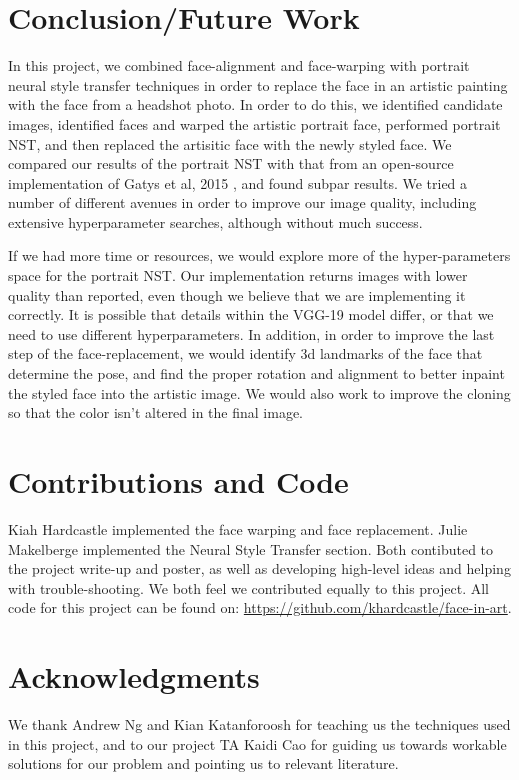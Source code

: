 \documentclass{article}
\begin{document}
\section{Conclusion/Future Work}

In this project, we combined face-alignment and face-warping with portrait neural style transfer techniques in order to replace the face in an artistic painting with the face from a headshot photo. In order to do this, we identified candidate images, identified faces and warped the artistic portrait face, performed portrait NST, and then replaced the artisitic face with the newly styled face. We compared our results of the portrait NST with that from an open-source implementation of Gatys et al, 2015 \cite{NeuralStyleTranferGithub}, and found subpar results. We tried a number of different avenues in order to improve our image quality, including extensive hyperparameter searches, although without much success.  

If we had more time or resources, we would explore more of the hyper-parameters space for the portrait NST. Our implementation returns images with lower quality than reported, even though we believe that we are implementing it correctly. It is possible that details within the VGG-19 model differ, or that we need to use different hyperparameters. In addition, in order to improve the last step of the face-replacement, we would identify 3d landmarks of the face that determine the pose, and find the proper rotation and alignment to better inpaint the styled face into the artistic image. We would also work to improve the cloning so that the color isn't altered in the final image. 


\newpage

\section{Contributions and Code}
Kiah Hardcastle implemented the face warping and face replacement. Julie Makelberge implemented the Neural Style Transfer section. Both contibuted to the project write-up and poster, as well as developing high-level ideas and helping with trouble-shooting. We both feel we contributed equally to this project. All code for this project can be found on: \url{https://github.com/khardcastle/face-in-art}.

\section{Acknowledgments}
We thank Andrew Ng and Kian Katanforoosh for teaching us the techniques used in this project, and to our project TA Kaidi Cao for guiding us towards workable solutions for our problem and pointing us to relevant literature.


\small



\end{document}
